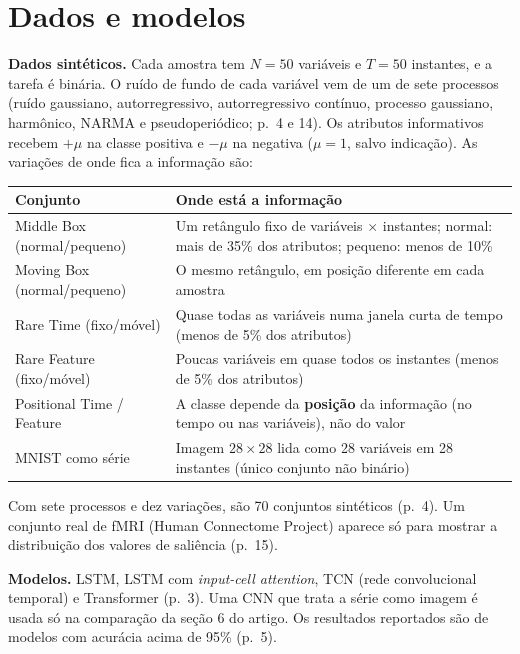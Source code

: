 \documentclass[11pt,a4paper]{article}
\begin{document}
\section{Dados e modelos}
\textbf{Dados sintéticos.} Cada amostra tem $N = 50$ variáveis e $T = 50$ instantes, e a tarefa é binária. O ruído de fundo de cada variável vem de um de sete processos (ruído gaussiano, autorregressivo, autorregressivo contínuo, processo gaussiano, harmônico, NARMA e pseudoperiódico; p.~4 e 14). Os atributos informativos recebem $+\mu$ na classe positiva e $-\mu$ na negativa ($\mu = 1$, salvo indicação). As variações de onde fica a informação são:
\begin{center}\small
\begin{tabularx}{\linewidth}{lX}
\toprule
\textbf{Conjunto} & \textbf{Onde está a informação} \\
\midrule
Middle Box (normal/pequeno) & Um retângulo fixo de variáveis $\times$ instantes; normal: mais de 35\% dos atributos; pequeno: menos de 10\% \\
Moving Box (normal/pequeno) & O mesmo retângulo, em posição diferente em cada amostra \\
Rare Time (fixo/móvel) & Quase todas as variáveis numa janela curta de tempo (menos de 5\% dos atributos) \\
Rare Feature (fixo/móvel) & Poucas variáveis em quase todos os instantes (menos de 5\% dos atributos) \\
Positional Time / Feature & A classe depende da \textbf{posição} da informação (no tempo ou nas variáveis), não do valor \\
MNIST como série & Imagem $28 \times 28$ lida como 28 variáveis em 28 instantes (único conjunto não binário) \\
\bottomrule
\end{tabularx}
\end{center}
Com sete processos e dez variações, são 70 conjuntos sintéticos (p.~4). Um conjunto real de fMRI (Human Connectome Project) aparece só para mostrar a distribuição dos valores de saliência (p.~15).

\textbf{Modelos.} LSTM, LSTM com \textit{input-cell attention}, TCN (rede convolucional temporal) e Transformer (p.~3). Uma CNN que trata a série como imagem é usada só na comparação da seção 6 do artigo. Os resultados reportados são de modelos com acurácia acima de 95\% (p.~5).
\end{document}
